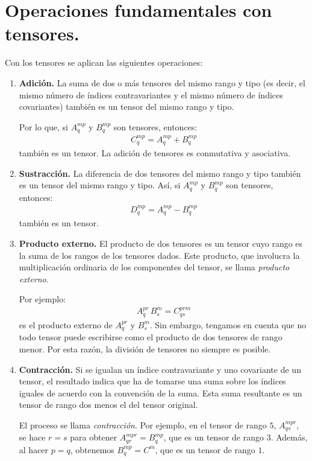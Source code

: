 \section{Operaciones fundamentales con tensores.}

Con los tensores se aplican las siguientes operaciones:
\begin{enumerate}
\item \textbf{Adición.} La suma de dos o más tensores del mismo rango y tipo (es decir, el mismo número de índices contravariantes y el mismo número de índices covariantes) también es un tensor del mismo rango y tipo.
\par
Por lo que, si $A_{q}^{mp}$ y $B_{q}^{mp}$ son tensores, entonces:
\begin{align*}
C_{q}^{mp} = A_{q}^{mp} + B_{q}^{mp}
\end{align*}
también es un tensor. La adición de tensores es conmutativa y asociativa.
\item \textbf{Sustracción.} La diferencia de dos tensores del mismo rango y tipo también es un tensor del mismo rango y tipo. Así, si $A_{q}^{mp}$ y $B_{q}^{mp}$ son tensores, entonces:
\begin{align*}
D_{q}^{mp} = A_{q}^{mp} - B_{q}^{mp}
\end{align*}
también es un tensor.
\item \textbf{Producto externo.} El producto de dos tensores es un tensor cuyo rango es la suma de los rangos de los
tensores dados. Este producto, que involucra la multiplicación ordinaria de los componentes del tensor, se
llama \emph{producto externo}.
\par
Por ejemplo:
\begin{align*}
A_{q}^{pr} \, B_{s}^{m} = C_{qs}^{prm}
\end{align*}
es el producto externo de $A_{q}^{pr}$ y $B_{s}^{m}$. Sin embargo, tengamos en cuenta que no todo tensor puede escribirse como el producto de dos tensores de rango menor. Por esta razón, la división de tensores no siempre es posible.
\item \textbf{Contracción.} Si se igualan un índice contravariante y uno covariante de un tensor, el resultado indica que ha de tomarse una suma sobre los índices iguales de acuerdo con la convención de la suma. Esta
suma resultante es un tensor de rango dos menos el del tensor original.
\par
El proceso se llama \emph{contracción}. Por ejemplo, en el tensor de rango $5$, $A_{qs}^{mpr}$, se hace $r = s$ para obtener $A_{qr}^{mpr} = B_{q}^{mp}$, que es un tensor de rango $3$. Además, al hacer $p = q$, obtenemos $B_{q}^{mp} = C^{m}$, que es un tensor de rango $1$.

\end{enumerate}

